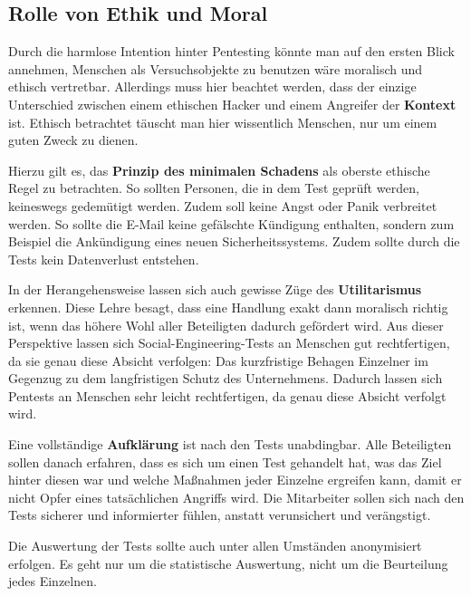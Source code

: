 \documentclass[12pt, a4paper, oneside]{scrartcl}
\begin{document}
\subsection{Rolle von Ethik und Moral}
Durch die harmlose Intention hinter Pentesting könnte man auf den ersten Blick annehmen, Menschen als Versuchsobjekte
zu benutzen wäre moralisch und ethisch vertretbar. Allerdings muss hier beachtet werden, dass der 
einzige Unterschied zwischen einem ethischen Hacker und einem Angreifer der \textbf{Kontext} ist.
Ethisch betrachtet täuscht man hier wissentlich Menschen, nur um einem guten Zweck zu dienen. 
\par
Hierzu gilt es, das \textbf{Prinzip des minimalen Schadens} als oberste ethische Regel zu betrachten. So sollten
Personen, die in dem Test geprüft werden, keineswegs gedemütigt werden. Zudem soll keine Angst oder Panik
verbreitet werden. So sollte die E-Mail keine gefälschte Kündigung enthalten, sondern zum Beispiel die 
Ankündigung eines neuen Sicherheitssystems. Zudem sollte durch die Tests kein Datenverlust entstehen.
\par
In der Herangehensweise lassen sich auch gewisse Züge des \textbf{Utilitarismus} erkennen. Diese Lehre besagt,
dass eine Handlung exakt dann moralisch richtig ist, wenn das höhere Wohl aller Beteiligten dadurch gefördert wird.
Aus dieser Perspektive lassen sich Social-Engineering-Tests an Menschen gut rechtfertigen, da sie genau diese Absicht
verfolgen: Das kurzfristige Behagen Einzelner im Gegenzug zu dem langfristigen Schutz des Unternehmens.
Dadurch lassen sich Pentests an Menschen sehr leicht rechtfertigen, da genau diese Absicht verfolgt wird.
\par
Eine vollständige \textbf{Aufklärung} ist nach den Tests unabdingbar. Alle Beteiligten sollen danach
erfahren, dass es sich um einen Test gehandelt hat, was das Ziel hinter diesen war und welche Maßnahmen
jeder Einzelne ergreifen kann, damit er nicht Opfer eines tatsächlichen Angriffs wird.
Die Mitarbeiter sollen sich nach den Tests sicherer und informierter fühlen, anstatt verunsichert und 
verängstigt.
\par
Die Auswertung der Tests sollte auch unter allen Umständen anonymisiert erfolgen. Es geht nur um
die statistische Auswertung, nicht um die Beurteilung jedes Einzelnen. 
\end{document}
